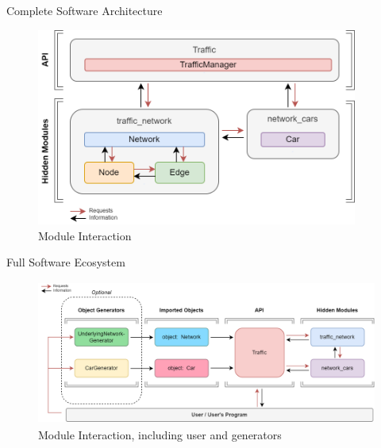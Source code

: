     
    \begin{frame}{Complete Software Architecture}
        \begin{figure}
            \centering
            \includegraphics[height=6.5cm]{Images/detailed_essentials.png}
            \caption{Module Interaction}
        \end{figure}
    \end{frame}
    
    \begin{frame}{Full Software Ecosystem}
        \begin{figure}
            \centering
            \includegraphics[height=4.75cm]{Images/complete_architecture.png}
            \caption{Module Interaction, including user and generators}
        \end{figure}
    \end{frame}